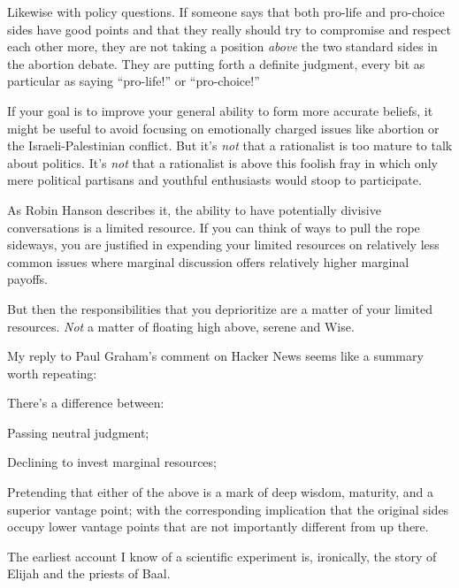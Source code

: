 {
 Likewise with policy questions. If someone says that both pro-life
and pro-choice sides have good points and that they really should try
to compromise and respect each other more, they are not taking a
position \textit{above} the two standard sides in the abortion debate.
They are putting forth a definite judgment, every bit as particular as
saying ``pro-life!'' or
``pro-choice!''}

{
 If your goal is to improve your general ability to form more
accurate beliefs, it might be useful to avoid focusing on emotionally
charged issues like abortion or the Israeli-Palestinian conflict. But
it's \textit{not} that a rationalist is too mature to
talk about politics. It's \textit{not} that a
rationalist is above this foolish fray in which only mere political
partisans and youthful enthusiasts would stoop to participate.}

{
 As Robin Hanson describes it, the ability to have potentially
divisive conversations is a limited resource. If you can think of ways
to pull the rope sideways, you are justified in expending your limited
resources on relatively less common issues where marginal discussion
offers relatively higher marginal payoffs.}

{
 But then the responsibilities that you deprioritize are a matter
of your limited resources. \textit{Not} a matter of floating high
above, serene and Wise.}

{
 My reply to Paul Graham's comment on Hacker News
seems like a summary worth repeating:}

{
 There's a difference between:}

{
 Passing neutral judgment;}

{
 Declining to invest marginal resources;}

{
 Pretending that either of the above is a mark of deep wisdom,
maturity, and a superior vantage point; with the corresponding
implication that the original sides occupy lower vantage points that
are not importantly different from up there.}

\myendsectiontext


\bigskip


{
 The earliest account I know of a scientific experiment is,
ironically, the story of Elijah and the priests of Baal. }

